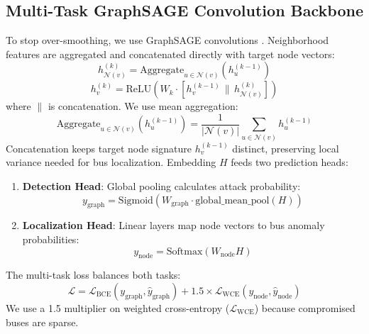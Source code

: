 \documentclass[conference]{IEEEtran}
\begin{document}
\subsection{Multi-Task GraphSAGE Convolution Backbone}
To stop over-smoothing, we use GraphSAGE convolutions \cite{b8}. Neighborhood features are aggregated and concatenated directly with target node vectors:
\begin{equation}
h_{\mathcal{N}(v)}^{(k)} = \text{Aggregate}_{u \in \mathcal{N}(v)} \left( h_u^{(k-1)} \right)
\end{equation}
\begin{equation}
h_v^{(k)} = \text{ReLU} \left( W_k \cdot \left[ h_v^{(k-1)} \,\|\, h_{\mathcal{N}(v)}^{(k)} \right] \right)
\end{equation}
where $\|$ is concatenation. We use mean aggregation:
\begin{equation}
\text{Aggregate}_{u \in \mathcal{N}(v)} \left( h_u^{(k-1)} \right) = \frac{1}{|\mathcal{N}(v)|} \sum_{u \in \mathcal{N}(v)} h_u^{(k-1)}
\end{equation}
Concatenation keeps target node signature $h_v^{(k-1)}$ distinct, preserving local variance needed for bus localization. Embedding $H$ feeds two prediction heads:
\begin{enumerate}
    \item \textbf{Detection Head}: Global pooling calculates attack probability:
    \begin{equation}
    y_{\text{graph}} = \text{Sigmoid}\left(W_{\text{graph}} \cdot \text{global\_mean\_pool}(H)\right)
    \end{equation}
    \item \textbf{Localization Head}: Linear layers map node vectors to bus anomaly probabilities:
    \begin{equation}
    y_{\text{node}} = \text{Softmax}(W_{\text{node}} H)
    \end{equation}
\end{enumerate}
The multi-task loss balances both tasks:
\begin{equation}
\mathcal{L} = \mathcal{L}_{\text{BCE}}(y_{\text{graph}}, \hat{y}_{\text{graph}}) + 1.5 \times \mathcal{L}_{\text{WCE}}(y_{\text{node}}, \hat{y}_{\text{node}})
\end{equation}
We use a 1.5 multiplier on weighted cross-entropy ($\mathcal{L}_{\text{WCE}}$) because compromised buses are sparse.
\end{document}
